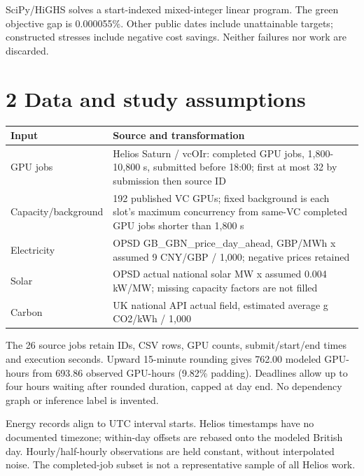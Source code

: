 \documentclass[10pt,a4paper]{article}
\begin{document}
{\small SciPy/HiGHS solves a start-indexed mixed-integer linear program. The green objective gap is 0.000055\%. Other public dates include unattainable targets; constructed stresses include negative cost savings. Neither failures nor work are discarded.\par}

\clearpage
\section*{2  Data and study assumptions}
\begin{center}\begingroup\setlength{\tabcolsep}{4pt}
\renewcommand{\arraystretch}{1.2}
\fontsize{8.3}{11.62}\selectfont
\begin{tabular}{@{}p{98.34pt}p{376.66pt}@{}}
\toprule
\textbf{Input} & \textbf{Source and transformation} \\
\midrule
GPU jobs & Helios Saturn / vcOIr: completed GPU jobs, 1,800-10,800 s, submitted before 18:00; first at most 32 by submission then source ID \\
Capacity/background & 192 published VC GPUs; fixed background is each slot's maximum concurrency from same-VC completed GPU jobs shorter than 1,800 s \\
Electricity & OPSD GB\_GBN\_price\_day\_ahead, GBP/MWh x assumed 9 CNY/GBP / 1,000; negative prices retained \\
Solar & OPSD actual national solar MW x assumed 0.004 kW/MW; missing capacity factors are not filled \\
Carbon & UK national API actual field, estimated average g CO2/kWh / 1,000 \\
\bottomrule\end{tabular}\endgroup\end{center}

The 26 source jobs retain IDs, CSV rows, GPU counts, submit/start/end times and execution seconds. Upward 15-minute rounding gives 762.00 modeled GPU-hours from 693.86 observed GPU-hours (9.82\% padding). Deadlines allow up to four hours waiting after rounded duration, capped at day end. No dependency graph or inference label is invented.

Energy records align to UTC interval starts. Helios timestamps have no documented timezone; within-day offsets are rebased onto the modeled British day. Hourly/half-hourly observations are held constant, without interpolated noise. The completed-job subset is not a representative sample of all Helios work.
\end{document}
